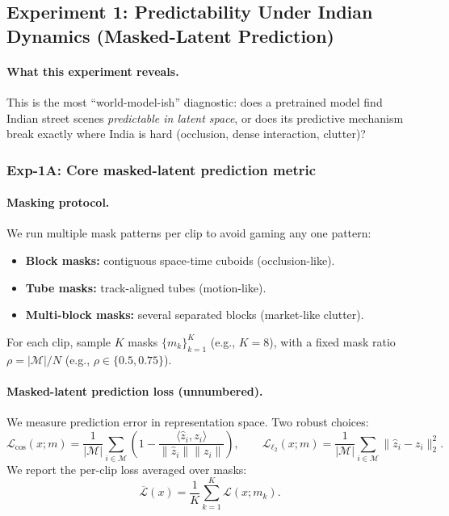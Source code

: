 \subsection{Experiment 1: Predictability Under Indian Dynamics (Masked-Latent Prediction)}
\label{sec:exp1}

\paragraph{What this experiment reveals.}
This is the most “world-model-ish” diagnostic: does a pretrained model find Indian street scenes \emph{predictable in latent space}, or does its predictive mechanism break exactly where India is hard (occlusion, dense interaction, clutter)?

\subsubsection{Exp-1A: Core masked-latent prediction metric}

\paragraph{Masking protocol.}
We run multiple mask patterns per clip to avoid gaming any one pattern:
\begin{itemize}[leftmargin=*,itemsep=2pt]
  \item \textbf{Block masks:} contiguous space-time cuboids (occlusion-like).
  \item \textbf{Tube masks:} track-aligned tubes (motion-like).
  \item \textbf{Multi-block masks:} several separated blocks (market-like clutter).
\end{itemize}
For each clip, sample $K$ masks $\{m_k\}_{k=1}^K$ (e.g., $K{=}8$), with a fixed mask ratio $\rho = |\mathcal{M}|/N$ (e.g., $\rho\in\{0.5,0.75\}$).

\paragraph{Masked-latent prediction loss (unnumbered).}
We measure prediction error in representation space. Two robust choices:
\[
\mathcal{L}_{\cos}(x;m) = \frac{1}{|\mathcal{M}|}\sum_{i\in\mathcal{M}}\left(1 - \frac{\langle \hat{z}_i, z_i \rangle}{\|\hat{z}_i\|\|z_i\|}\right),
\qquad
\mathcal{L}_{\ell_2}(x;m) = \frac{1}{|\mathcal{M}|}\sum_{i\in\mathcal{M}} \|\hat{z}_i - z_i\|_2^2.
\]
We report the per-clip loss averaged over masks:
\[
\overline{\mathcal{L}}(x) = \frac{1}{K}\sum_{k=1}^K \mathcal{L}(x;m_k).
\]

